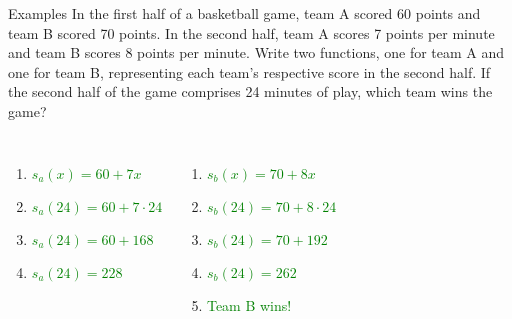 \documentclass{beamer}
\begin{document}
\begin{frame}{Examples}
  In the first half of a basketball game, team A scored 60 points and
  team B scored 70 points.  In the second half, team A scores 7 points
  per minute and team B scores 8 points per minute.  
  \newline\newline 
  Write two functions, one for team A and one for team B, representing each
  team's respective score in the second half.  If the second half of
  the game comprises 24 minutes of play, which team wins the game?

  \begin{columns}
  \begin{enumerate}[<+(1)->]
    \item \textcolor{green}{$s_a(x) = 60 + 7x$}
    \item \textcolor{green}{$s_a(24) = 60 + 7\cdot 24$}
    \item \textcolor{green}{$s_a(24) = 60 + 168$}
    \item \textcolor{green}{$s_a(24) = 228$}
  \end{enumerate}

  \begin{enumerate}[<+(1)->]
    \item \textcolor{green}{$s_b(x) = 70 + 8x$}
    \item \textcolor{green}{$s_b(24) = 70 + 8\cdot 24$}
    \item \textcolor{green}{$s_b(24) = 70 + 192$}
    \item \textcolor{green}{$s_b(24) = 262$}
    \item \textcolor{green}{Team B wins!}
  \end{enumerate}
  \end{columns}
\end{frame}
\end{document}
